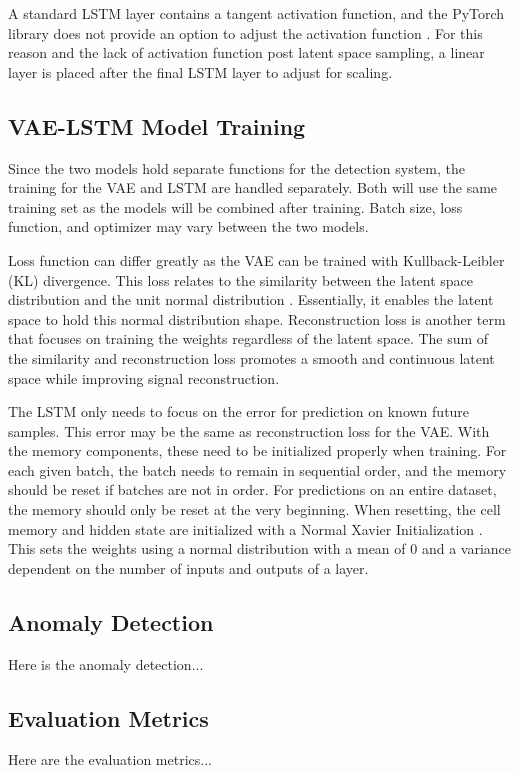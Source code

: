 \documentclass[conference]{IEEEtran}
\begin{document}
A standard LSTM layer contains a tangent activation function, and the PyTorch library does not provide an option to adjust the activation function \cite{lstm_pytorch}. For this reason and the lack of activation function post latent space sampling, a linear layer is placed after the final LSTM layer to adjust for scaling.

\subsection{VAE-LSTM Model Training}
Since the two models hold separate functions for the detection system, the training for the VAE and LSTM are handled separately. Both will use the same training set as the models will be combined after training. Batch size, loss function, and optimizer may vary between the two models.

Loss function can differ greatly as the VAE can be trained with Kullback-Leibler (KL) divergence. This loss relates to the similarity between the latent space distribution and the unit normal distribution \cite{vae_page}. Essentially, it enables the latent space to hold this normal distribution shape. Reconstruction loss is another term that focuses on training the weights regardless of the latent space. The sum of the similarity and reconstruction loss promotes a smooth and continuous latent space while improving signal reconstruction.

The LSTM only needs to focus on the error for prediction on known future samples. This error may be the same as reconstruction loss for the VAE. With the memory components, these need to be initialized properly when training. For each given batch, the batch needs to remain in sequential order, and the memory should be reset if batches are not in order. For predictions on an entire dataset, the memory should only be reset at the very beginning. When resetting, the cell memory and hidden state are initialized with a Normal Xavier Initialization \cite{xavier}. This sets the weights using a normal distribution with a mean of 0 and a variance dependent on the number of inputs and outputs of a layer.

\subsection{Anomaly Detection}
Here is the anomaly detection...

\subsection{Evaluation Metrics}
Here are the evaluation metrics...
\end{document}
